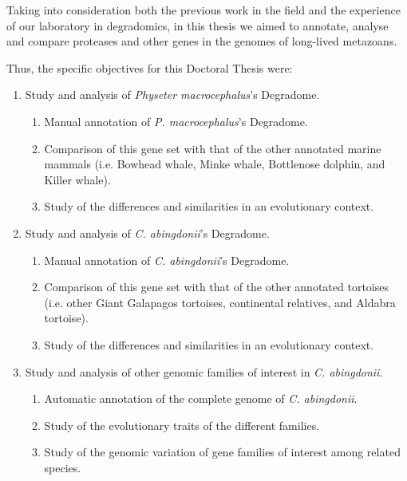 Taking into consideration both the previous work in the field and the experience of our laboratory in degradomics, in this thesis we aimed to annotate, analyse and compare proteases and other genes in the genomes of long-lived metazoans.

Thus, the specific objectives for this Doctoral Thesis were:

\begin{enumerate}[topsep=1ex,itemsep=1ex]
    \item Study and analysis of \textsl{Physeter macrocephalus}'s Degradome.
    \begin{enumerate}[label=\arabic{enumi}.\arabic*,itemsep=0ex]
        \item Manual annotation of \textsl{P. macrocephalus}'s Degradome.
        \item Comparison of this gene set with that of the other annotated marine mammals (i.e. Bowhead whale, Minke whale, Bottlenose dolphin, and Killer whale).
        \item Study of the differences and similarities in an evolutionary context.
    \end{enumerate}
    \item Study and analysis of \textsl{C. abingdonii}'s Degradome.
    \begin{enumerate}[label=\arabic{enumi}.\arabic*,itemsep=0ex]
        \item Manual annotation of \textsl{C. abingdonii}'s Degradome.
        \item Comparison of this gene set with that of the other annotated tortoises (i.e. other Giant Galapagos tortoises, continental relatives, and Aldabra tortoise).
        \item Study of the differences and similarities in an evolutionary context.
    \end{enumerate}
    \item Study and analysis of other genomic families of interest in \textsl{C. abingdonii}.
    \begin{enumerate}[label=\arabic{enumi}.\arabic*,itemsep=0ex]
        \item Automatic annotation of the complete genome of \textsl{C. abingdonii}.
        \item Study of the evolutionary traits of the different families.
        \item Study of the genomic variation of gene families of interest among related species.
    \end{enumerate}
\end{enumerate}
